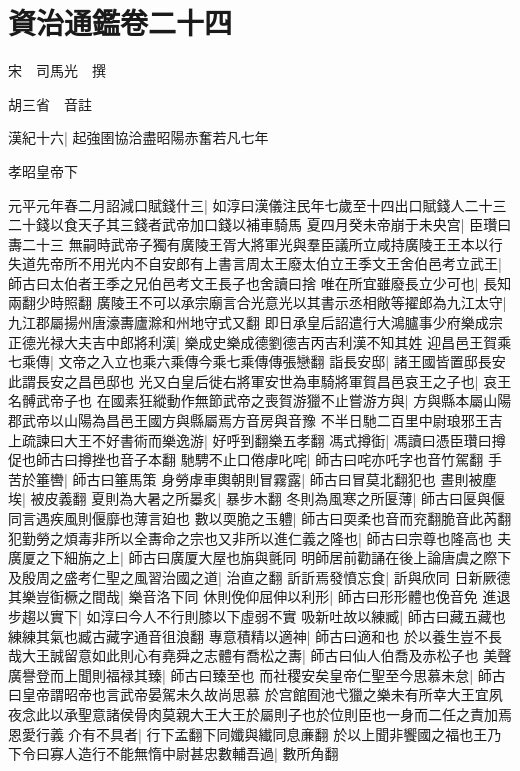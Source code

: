 \section{資治通鑑卷二十四}
宋　司馬光　撰

胡三省　音註

漢紀十六|{
	起強圉協洽盡昭陽赤奮若凡七年}


孝昭皇帝下

元平元年春二月詔減口賦錢什三|{
	如淳曰漢儀注民年七歲至十四出口賦錢人二十三二十錢以食天子其三錢者武帝加口錢以補車騎馬}
夏四月癸未帝崩于未央宫|{
	臣瓚曰夀二十三}
無嗣時武帝子獨有廣陵王胥大將軍光與羣臣議所立咸持廣陵王王本以行失道先帝所不用光内不自安郎有上書言周太王廢太伯立王季文王舍伯邑考立武王|{
	師古曰太伯者王季之兄伯邑考文王長子也舍讀曰捨}
唯在所宜雖廢長立少可也|{
	長知兩翻少時照翻}
廣陵王不可以承宗廟言合光意光以其書示丞相敞等擢郎為九江太守|{
	九江郡屬揚州唐濠夀廬滁和州地守式又翻}
即日承皇后詔遣行大鴻臚事少府樂成宗正德光禄大夫吉中郎將利漢|{
	樂成史樂成德劉德吉丙吉利漢不知其姓}
迎昌邑王賀乘七乘傳|{
	文帝之入立也乘六乘傳今乘七乘傳傳張戀翻}
詣長安邸|{
	諸王國皆置邸長安此謂長安之昌邑邸也}
光又白皇后徙右將軍安世為車騎將軍賀昌邑哀王之子也|{
	哀王名髆武帝子也}
在國素狂縱動作無節武帝之喪賀游獵不止嘗游方與|{
	方與縣本屬山陽郡武帝以山陽為昌邑王國方與縣屬焉方音房與音豫}
不半日馳二百里中尉琅邪王吉上疏諫曰大王不好書術而樂逸游|{
	好呼到翻樂五孝翻}
馮式撙衘|{
	馮讀曰憑臣瓚曰撙促也師古曰撙挫也音子本翻}
馳騁不止口倦虖叱咤|{
	師古曰咤亦吒字也音竹駕翻}
手苦於箠轡|{
	師古曰箠馬策}
身勞虖車輿朝則冒霧露|{
	師古曰冒莫北翻犯也}
晝則被塵埃|{
	被皮義翻}
夏則為大暑之所㬥炙|{
	暴步木翻}
冬則為風寒之所匽薄|{
	師古曰匽與偃同言遇疾風則偃靡也薄言廹也}
數以耎脆之玉軆|{
	師古曰耎柔也音而兖翻脆音此芮翻}
犯勤勞之煩毒非所以全夀命之宗也又非所以進仁義之隆也|{
	師古曰宗尊也隆高也}
夫廣厦之下細旃之上|{
	師古曰廣厦大屋也旃與氈同}
明師居前勸誦在後上論唐虞之際下及殷周之盛考仁聖之風習治國之道|{
	治直之翻}
訢訢焉發憤忘食|{
	訢與欣同}
日新厥德其樂豈衘橛之間哉|{
	樂音洛下同}
休則俛仰屈伸以利形|{
	師古曰形形體也俛音免}
進退步趨以實下|{
	如淳曰今人不行則膝以下虛弱不實}
吸新吐故以練臧|{
	師古曰藏五藏也練練其氣也臧古藏字通音徂浪翻}
專意積精以適神|{
	師古曰適和也}
於以養生豈不長哉大王誠留意如此則心有堯舜之志體有喬松之夀|{
	師古曰仙人伯喬及赤松子也}
美聲廣譽登而上聞則福禄其臻|{
	師古曰臻至也}
而社稷安矣皇帝仁聖至今思慕未怠|{
	師古曰皇帝謂昭帝也言武帝晏駕未久故尚思慕}
於宫館囿池弋獵之樂未有所幸大王宜夙夜念此以承聖意諸侯骨肉莫親大王大王於屬則子也於位則臣也一身而二任之責加焉恩愛行義介有不具者|{
	行下孟翻下同孅與纎同息亷翻}
於以上聞非饗國之福也王乃下令曰寡人造行不能無惰中尉甚忠數輔吾過|{
	數所角翻}
